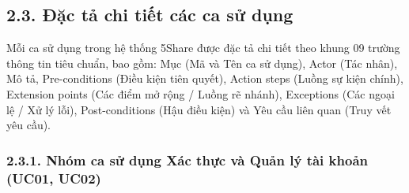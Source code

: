 \subsection{2.3. Đặc tả chi tiết các ca sử dụng}

Mỗi ca sử dụng trong hệ thống 5Share được đặc tả chi tiết theo khung 09 trường thông tin tiêu chuẩn, bao gồm: Mục (Mã và Tên ca sử dụng), Actor (Tác nhân), Mô tả, Pre-conditions (Điều kiện tiên quyết), Action steps (Luồng sự kiện chính), Extension points (Các điểm mở rộng / Luồng rẽ nhánh), Exceptions (Các ngoại lệ / Xử lý lỗi), Post-conditions (Hậu điều kiện) và Yêu cầu liên quan (Truy vết yêu cầu).

\subsubsection{2.3.1. Nhóm ca sử dụng Xác thực và Quản lý tài khoản (UC01, UC02)}

